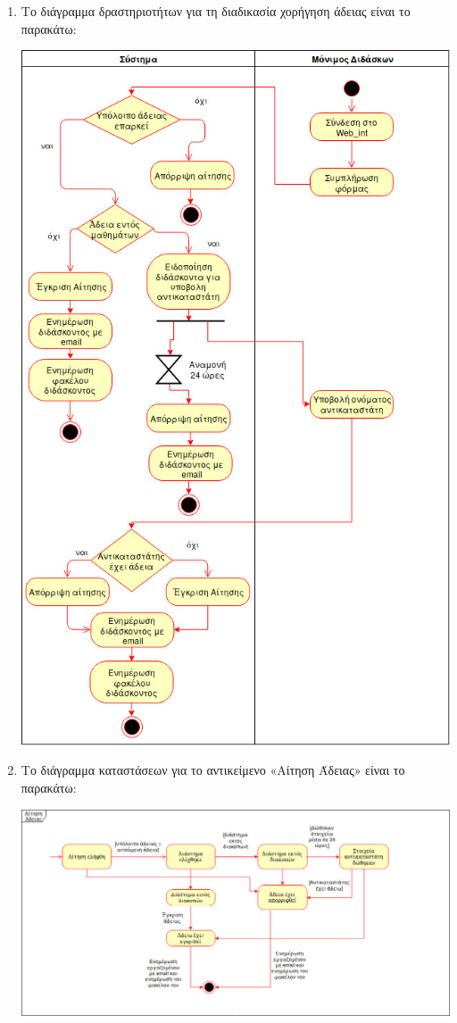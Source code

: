 \documentclass[12pt]{article}
\begin{document}
\begin{enumerate}
\newpage
\item
Το διάγραμμα δραστηριοτήτων για τη διαδικασία χορήγηση άδειας είναι το παρακάτω:
\begin{center}
\includegraphics[scale=0.5]{activity}
\end{center}

\newpage
\item
Το διάγραμμα καταστάσεων για το αντικείμενο «Αίτηση Άδειας» είναι το παρακάτω:
\begin{center}
\includegraphics[scale=0.35]{state_diag}
\end{center}


\end{enumerate}
\end{document}
